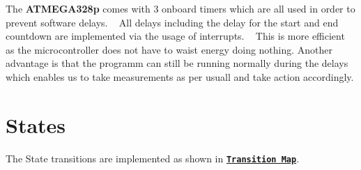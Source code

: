 The {\bfseries A\+T\+M\+E\+G\+A328p} comes with 3 onboard timers which are all used in order to prevent software delays. ~\newline
All delays including the delay for the start and end countdown are implemented via the usage of interrupts. ~\newline
This is more efficient as the microcontroller does not have to waist energy doing nothing. Another advantage is that the programm can still be running normally during the delays which enables us to take measurements as per usuall and take action accordingly.\hypertarget{index_States}{}\section{States}\label{index_States}
The State transitions are implemented as shown in \href{transition_map.pdf}{\tt {\bfseries Transition Map}}.
